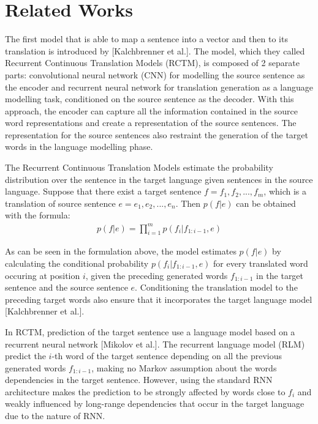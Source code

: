 \documentclass[12pt]{extarticle}
\begin{document}
\section*{Related Works}
The first model that is able to map a sentence into a vector and then to its translation is introduced by [Kalchbrenner et al.]. The model, which they called Recurrent Continuous Translation Models (RCTM), is composed of 2 separate parts: convolutional neural network (CNN) for modelling the source sentence as the encoder and recurrent neural network for translation generation as a language modelling task, conditioned on the source sentence as the decoder. With this approach, the encoder can capture all the information contained in the source word representations and create a representation of the source sentences. The representation for the source sentences also restraint the generation of the target words in the language modelling phase.

The Recurrent Continuous Translation Models estimate the probability distribution over the sentence in the target language given sentences in the source language. Suppose that there exist a target sentence $f = f_{1},f_{2},...,f_{m}$, which is a translation of source sentence $e = e_{1}, e_{2},...,e_{n}$. Then $p(f|e)$ can be obtained with the formula:
\begin{align} \label{eq:9}
p(f|e) = \prod_{i=1}^{m} p(f_{i}|f_{1:i-1}, e)
\end{align}

As can be seen in the formulation above, the model estimates $p(f|e)$ by calculating the conditional probability $p(f_{i}|f_{1:i-1}, e)$ for every translated word occuring at position $i$, given the preceding generated words $f_{1:i-1}$ in the target sentence and the source sentence $e$. Conditioning the translation model to the preceding target words also ensure that it incorporates the target language model [Kalchbrenner et al.].

In RCTM, prediction of the target sentence use a language model based on a recurrent neural network [Mikolov et al.]. The recurrent language model (RLM) predict the $i$-th word of the target sentence depending on all the previous generated words $f_{1:i-1}$, making no Markov assumption about the words dependencies in the target sentence. However, using the standard RNN architecture makes the prediction to be strongly affected by words close to $f_{i}$ and weakly influenced by long-range dependencies that occur in the target language due to the nature of RNN.
\end{document}

